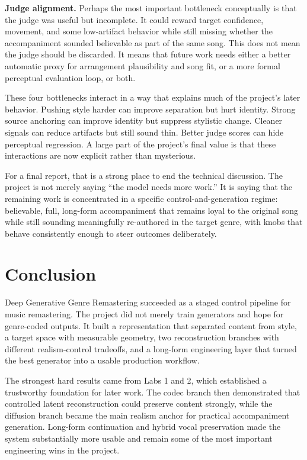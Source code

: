 \documentclass[conference]{IEEEtran}
\begin{document}
\textbf{Judge alignment.} Perhaps the most important bottleneck conceptually is that the judge was useful but incomplete. It could reward target confidence, movement, and some low-artifact behavior while still missing whether the accompaniment sounded believable as part of the same song. This does not mean the judge should be discarded. It means that future work needs either a better automatic proxy for arrangement plausibility and song fit, or a more formal perceptual evaluation loop, or both.

These four bottlenecks interact in a way that explains much of the project's later behavior. Pushing style harder can improve separation but hurt identity. Strong source anchoring can improve identity but suppress stylistic change. Cleaner signals can reduce artifacts but still sound thin. Better judge scores can hide perceptual regression. A large part of the project's final value is that these interactions are now explicit rather than mysterious.

For a final report, that is a strong place to end the technical discussion. The project is not merely saying ``the model needs more work.'' It is saying that the remaining work is concentrated in a specific control-and-generation regime: believable, full, long-form accompaniment that remains loyal to the original song while still sounding meaningfully re-authored in the target genre, with knobs that behave consistently enough to steer outcomes deliberately.

\section{Conclusion}
Deep Generative Genre Remastering succeeded as a staged control pipeline for music remastering. The project did not merely train generators and hope for genre-coded outputs. It built a representation that separated content from style, a target space with measurable geometry, two reconstruction branches with different realism-control tradeoffs, and a long-form engineering layer that turned the best generator into a usable production workflow.

The strongest hard results came from Labs 1 and 2, which established a trustworthy foundation for later work. The codec branch then demonstrated that controlled latent reconstruction could preserve content strongly, while the diffusion branch became the main realism anchor for practical accompaniment generation. Long-form continuation and hybrid vocal preservation made the system substantially more usable and remain some of the most important engineering wins in the project.
\end{document}
